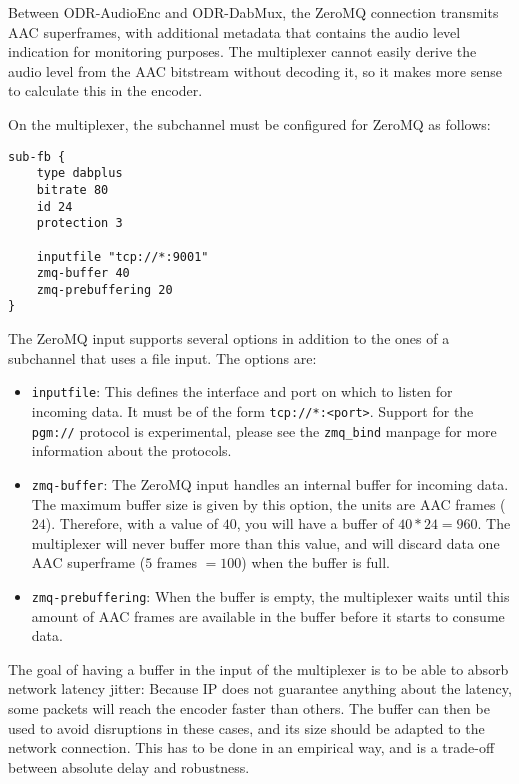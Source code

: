 Between ODR-AudioEnc and ODR-DabMux, the ZeroMQ connection transmits AAC
superframes, with additional metadata that contains the audio level indication
for monitoring purposes. The multiplexer cannot easily derive the audio level
from the AAC bitstream without decoding it, so it makes more sense to calculate
this in the encoder.

On the multiplexer, the subchannel must be configured for ZeroMQ as follows:
\begin{lstlisting}
sub-fb {
    type dabplus
    bitrate 80
    id 24
    protection 3

    inputfile "tcp://*:9001"
    zmq-buffer 40
    zmq-prebuffering 20
}
\end{lstlisting}

The ZeroMQ input supports several options in addition to the ones of a
subchannel that uses a file input. The options are:

\begin{itemize}
    \item \texttt{inputfile}: This defines the interface and port on which to
        listen for incoming data. It must be of the form
        \texttt{tcp://*:<port>}. Support for the \texttt{pgm://} protocol is
        experimental, please see the \texttt{zmq\_bind} manpage for more
        information about the protocols.
    \item \texttt{zmq-buffer}: The ZeroMQ input handles an internal buffer for
        incoming data. The maximum buffer size is given by this option, the
        units are AAC frames ($24$\ms). Therefore, with a value of $40$, you
        will have a buffer of $40 * 24 = 960$\ms. The multiplexer will never
        buffer more than this value, and will discard data one AAC superframe
        ($5$ frames $= 100$\ms) when the buffer is full.
    \item \texttt{zmq-prebuffering}: When the buffer is empty, the multiplexer
        waits until this amount of AAC frames are available in the buffer
        before it starts to consume data.
\end{itemize}

The goal of having a buffer in the input of the multiplexer is to be able to
absorb network latency jitter: Because IP does not guarantee anything about the
latency, some packets will reach the encoder faster than others. The buffer can
then be used to avoid disruptions in these cases, and its size should be
adapted to the network connection. This has to be done in an empirical way, and
is a trade-off between absolute delay and robustness.

